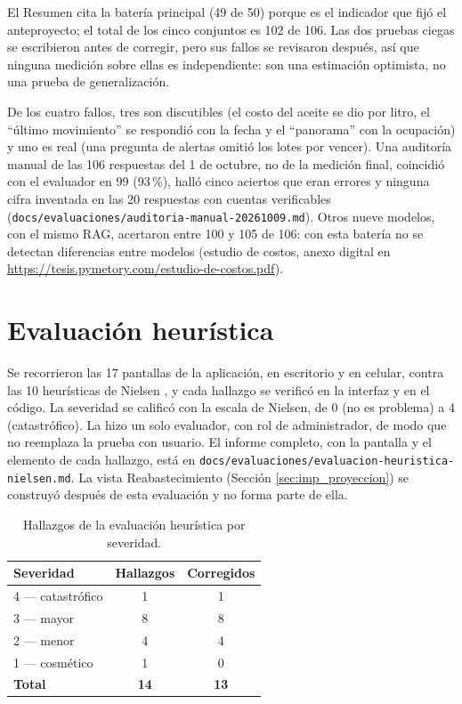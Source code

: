 El Resumen cita la batería principal (49 de 50) porque es el indicador que fijó el anteproyecto; el total de los cinco conjuntos es 102 de 106. Las dos pruebas ciegas se escribieron antes de corregir, pero sus fallos se revisaron después, así que ninguna medición sobre ellas es independiente: son una estimación optimista, no una prueba de generalización.

De los cuatro fallos, tres son discutibles (el costo del aceite se dio por litro, el ``último movimiento'' se respondió con la fecha y el ``panorama'' con la ocupación) y uno es real (una pregunta de alertas omitió los lotes por vencer). Una auditoría manual de las 106 respuestas del 1 de octubre, no de la medición final, coincidió con el evaluador en 99 (93\,\%), halló cinco aciertos que eran errores y ninguna cifra inventada en las 20 respuestas con cuentas verificables (\texttt{docs/evaluaciones/auditoria-manual-20261009.md}). Otros nueve modelos, con el mismo RAG, acertaron entre 100 y 105 de 106: con esta batería no se detectan diferencias entre modelos (estudio de costos, anexo digital en \url{https://tesis.pymetory.com/estudio-de-costos.pdf}).

\section{Evaluación heurística}
\label{sec:pru_nielsen}

Se recorrieron las 17 pantallas de la aplicación, en escritorio y en celular, contra las 10 heurísticas de Nielsen \cite{nielsen1994heuristics}, y cada hallazgo se verificó en la interfaz y en el código. La severidad se calificó con la escala de Nielsen, de 0 (no es problema) a 4 (catastrófico). La hizo un solo evaluador, con rol de administrador, de modo que no reemplaza la prueba con usuario. El informe completo, con la pantalla y el elemento de cada hallazgo, está en \texttt{docs/evaluaciones/evaluacion-heuristica-nielsen.md}. La vista Reabastecimiento (Sección \ref{sec:imp_proyeccion}) se construyó después de esta evaluación y no forma parte de ella.

\begin{table}[!htbp]
\centering
\caption{Hallazgos de la evaluación heurística por severidad.}
\label{tab:pru_nielsen}
\begin{tabular}{|l|c|c|}
\hline
\textbf{Severidad} & \textbf{Hallazgos} & \textbf{Corregidos} \\
\hline
4 --- catastrófico & 1 & 1 \\ \hline
3 --- mayor & 8 & 8 \\ \hline
2 --- menor & 4 & 4 \\ \hline
1 --- cosmético & 1 & 0 \\ \hline
\textbf{Total} & \textbf{14} & \textbf{13} \\ \hline
\end{tabular}
\end{table}

